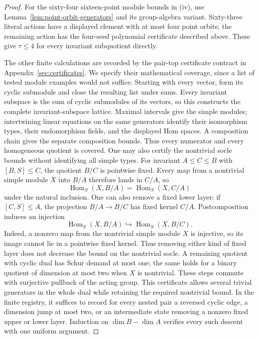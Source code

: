 \begin{proof}
For the sixty-four sixteen-point module bounds in (iv), use
Lemma~\ref{lem:point-orbit-generators} and its group-algebra variant.
Sixty-three literal actions have a displayed element with at most four
point orbits; the remaining action has the four-seed polynomial
certificate described above. These give $\tau\leq4$ for every invariant
subquotient directly.

The other finite calculations are recorded by the pair-top certificate
contract in Appendix~\ref{sec:certificates}. We specify their mathematical
coverage, since a list of tested module examples would not suffice.
Starting with every vector, form its cyclic submodule and close the
resulting list under sums. Every invariant subspace is the sum of
cyclic submodules of its vectors, so this constructs the complete
invariant-subspace lattice. Maximal intervals give the simple modules;
intertwining linear equations on the same generators identify their
isomorphism types, their endomorphism fields, and the displayed Hom
spaces. A composition chain gives the separate composition bounds.
Thus every numerator and every homogeneous quotient is covered.
One may also certify the nontrivial socle bounds without identifying all
simple types. For invariant $A\leq C\leq B$ with $[B,S]\leq C$,
the quotient $B/C$ is pointwise fixed. Every map from a nontrivial simple
module $X$ into $B/A$ therefore lands in $C/A$, so
\[
 \operatorname{Hom}_S(X,B/A)=\operatorname{Hom}_S(X,C/A)
\]
under the natural inclusion. One can also remove a fixed lower layer:
if $[C,S]\leq A$, the projection $B/A\to B/C$ has fixed kernel $C/A$.
Postcomposition induces an injection
\[
 \operatorname{Hom}_S(X,B/A)\hookrightarrow\operatorname{Hom}_S(X,B/C).
\]
Indeed, a nonzero map from the nontrivial simple module $X$ is injective,
so its image cannot lie in a pointwise fixed kernel. Thus removing either
kind of fixed layer does not decrease the bound on the nontrivial socle.
A remaining quotient with cyclic dual has Schur demand at most one;
the same holds for a binary quotient of dimension at most two when $X$
is nontrivial. These steps commute with surjective pullback of the acting
group. This certificate allows several trivial generators in the whole
dual while retaining the required nontrivial bound.
In the finite registry, it suffices to record for every nested pair a
reversed cyclic edge, a dimension jump at most two, or an intermediate
state removing a nonzero fixed upper or lower layer. Induction on
$\dim B-\dim A$ verifies every such descent with one uniform argument.

\end{proof}
